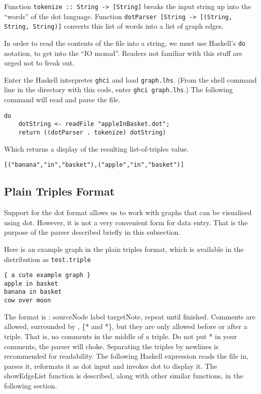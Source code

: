 \documentclass[a4paper]{article}
\begin{document}
Function {\tt tokenize :: String -> [String]} breaks the input string
up into the ``words'' of the dot language.  Function {\tt dotParser
  [String -> [(String, String, String)]} converts this list of words
into a list of graph edges.

In order to read the contents of the file into a string, we must use
Haskell's {\tt do} notation, to get into the ``IO monad''.  Readers
not familiar with this stuff are urged not to freak out.

Enter the Haskell interpreter {\tt ghci} and load {\tt graph.lhs}.
(From the shell command line in the directory with this code, enter
{\tt ghci graph.lhs}.)  The following command will read and parse the
file.

\begin{verbatim}
do 
    dotString <- readFile "appleInBasket.dot"; 
    return ((dotParser . tokenize) dotString)
\end{verbatim}
Which returns a display of the resulting list-of-triples value.

\begin{verbatim}
[("banana","in","basket"),("apple","in","basket")]
\end{verbatim}

\subsection{Plain Triples Format}
Support for the dot format allows us to work with graphs that can be
visualised using dot.  However, it is not a very convenient form for
data entry.  That is the purpose of the parser described briefly in
this subsection.

Here is an example graph in the plain triples format, which is
available in the distribution as {\tt test.triple}

\begin{verbatim}
{ a cute example graph }
apple in basket
banana in basket
cow over moon
\end{verbatim}
The format is : sourceNode label targetNote, repeat until finished.
Comments are allowed, surrounded by , \{* and *\}, but they are only
allowed before or after a triple.  That is, no comments in the middle
of a triple.  Do not put * in your comments, the parser will choke.
Separating the triples by newlines is recommended for readability.
The following Haskell expression reads the file in, parses it,
reformats it as dot input and invokes dot to display it.  The
showEdgeList function is described, along with other similar
functions, in the following section.
\end{document}
